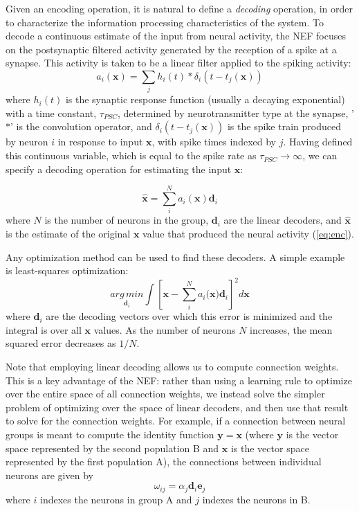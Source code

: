 \documentclass[english]{article}
\begin{document}
Given an encoding operation, it is natural to define a \textit{decoding} operation,
in order to characterize the information processing characteristics
of the system. To decode a continuous
estimate of the input from neural activity, the NEF focuses on the
postsynaptic filtered activity generated by the reception of a spike
at a synapse. This activity is taken to be a linear filter applied
to the spiking activity:
\[
a_{i}(\mathbf{x})=\sum_{j}h_{i}(t)*\delta_{i}(t-t_{j}(\mathbf{x}))
\]
where $h_{i}(t)$ is the synaptic response function (usually a decaying
exponential) with a time constant, $\tau_{PSC}$, determined by neurotransmitter
type at the synapse, '$*$' is the convolution operator, and $\delta_{i}(t-t_{j}(\mathbf{x}))$
is the spike train produced by neuron $i$ in response to input $\mathbf{x}$,
with spike times indexed by $j$. Having defined this continuous variable,
which is equal to the spike rate as $\tau_{PSC}\rightarrow\infty$,
we can specify a decoding operation for estimating the input $\mathbf{x}$:

\begin{equation}
\hat{\mathbf{x}}=\sum_{i}^{N}a_{i}\mathbf{(x)}\mathbf{d}_{i}\label{eq:dec}
\end{equation}
where $N$ is the number of neurons in the group, $\mathbf{d}_{i}$
are the linear decoders, and $\hat{\mathbf{x}}$ is the estimate of
the original $\mathbf{x}$ value that produced the neural activity
(\ref{eq:enc}). 

Any optimization method can be used to find these decoders. A simple example is least-squares optimization:
\begin{equation}
\underset{\mathbf{d}_{i}}{arg\, min}\int[\mathbf{x}-\sum_{i}^{N}a_{i}(\mathbf{x)}\mathbf{d}_{i}]^{2}d\mathbf{x}\label{eq:error}
\end{equation}
where $\mathbf{d}_{i}$ are the decoding vectors over which this error
is minimized and the integral is over all $\mathbf{x}$ values. As the number of neurons
$N$ increases, the mean squared error decreases as $1/N$. 

Note that employing linear decoding allows us to compute connection weights. This
is a key advantage of the NEF: rather than using a learning rule to
optimize over the entire space of all connection weights, we instead
solve the simpler problem of optimizing over the space of linear decoders,
and then use that result to solve for the connection weights. For example, if a connection between neural groups is meant to compute
the identity function $\mathbf{y}=\mathbf{x}$ (where $\mathbf{y}$
is the vector space represented by the second population B and $\mathbf{x}$
is the vector space represented by the first population A), the connections
between individual neurons are given by 
\begin{equation}
\omega_{ij}=\alpha_{j}\mathbf{d}_{i}\mathbf{e}_{j}\label{eq:weights}
\end{equation}
where $i$ indexes the neurons in group A and $j$ indexes the neurons
in B.
\end{document}
